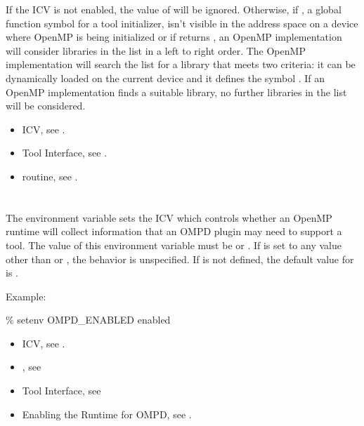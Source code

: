 If the  ICV is not enabled, 
the value of  will be ignored.
Otherwise, if , a global function symbol for a tool initializer,
isn't visible in the address space on a device where OpenMP is being
initialized or if  returns , an OpenMP implementation 
will consider libraries in the  list 
in a left to right order.  The OpenMP implementation will search the list for 
a library that meets two criteria: it can be dynamically
loaded on the current device and it defines the symbol .
If an OpenMP implementation finds a suitable library, 
no further libraries in the list will be considered.

\crossreferences
\begin{itemize}
\item {} ICV, see .
\item Tool Interface, see .
\item {} routine, see .
\end{itemize}

\section{}
\label{sec:OMPD_ENABLED}

The  environment variable sets the
 ICV which controls whether an OpenMP runtime
will collect information that an OMPD plugin may need to support
a tool.
The value of this environment variable must be 
or .
If  is set to any value other than 
or , the behavior is unspecified.
If  is not defined, the default value for
 is .

Example:
\begin{boxedcode}
\% setenv OMPD\_ENABLED enabled
\end{boxedcode}

\crossreferences
\begin{itemize}
\item {} ICV,
see .
\item {}, see 
\item Tool Interface, see 
\item Enabling the Runtime for OMPD, see .
\end{itemize}


